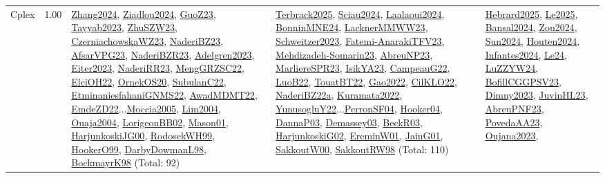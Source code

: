 {\begin{longtable}{p{3cm}r>{\raggedright\arraybackslash}p{6cm}>{\raggedright\arraybackslash}p{6cm}>{\raggedright\arraybackslash}p{8cm}}
\index{Cplex}\index{CPSystems!Cplex}Cplex &  1.00 & \hyperref[detail:Zhang2024]{Zhang2024}, \hyperref[detail:Ziadlou2024]{Ziadlou2024}, \hyperref[detail:GuoZ23]{GuoZ23}, \hyperref[detail:Tayyab2023]{Tayyab2023}, \hyperref[detail:ZhuSZW23]{ZhuSZW23}, \hyperref[detail:CzerniachowskaWZ23]{CzerniachowskaWZ23}, \hyperref[detail:NaderiBZ23]{NaderiBZ23}, \hyperref[detail:AfsarVPG23]{AfsarVPG23}, \hyperref[detail:NaderiBZR23]{NaderiBZR23}, \hyperref[detail:Adelgren2023]{Adelgren2023}, \hyperref[detail:Eiter2023]{Eiter2023}, \hyperref[detail:NaderiRR23]{NaderiRR23}, \hyperref[detail:MengGRZSC22]{MengGRZSC22}, \hyperref[detail:ElciOH22]{ElciOH22}, \hyperref[detail:OrnekOS20]{OrnekOS20}, \hyperref[detail:SubulanC22]{SubulanC22}, \hyperref[detail:EtminaniesfahaniGNMS22]{EtminaniesfahaniGNMS22}, \hyperref[detail:AwadMDMT22]{AwadMDMT22}, \hyperref[detail:EmdeZD22]{EmdeZD22}...\hyperref[detail:Moccia2005]{Moccia2005}, \hyperref[detail:Lim2004]{Lim2004}, \hyperref[detail:Ouaja2004]{Ouaja2004}, \hyperref[detail:LorigeonBB02]{LorigeonBB02}, \hyperref[detail:Mason01]{Mason01}, \hyperref[detail:HarjunkoskiJG00]{HarjunkoskiJG00}, \hyperref[detail:RodosekWH99]{RodosekWH99}, \hyperref[detail:HookerO99]{HookerO99}, \hyperref[detail:DarbyDowmanL98]{DarbyDowmanL98}, \hyperref[detail:BockmayrK98]{BockmayrK98} (Total: 92) & \hyperref[detail:Terbrack2025]{Terbrack2025}, \hyperref[detail:Sciau2024]{Sciau2024}, \hyperref[detail:Laalaoui2024]{Laalaoui2024}, \hyperref[detail:BonninMNE24]{BonninMNE24}, \hyperref[detail:LacknerMMWW23]{LacknerMMWW23}, \hyperref[detail:Schweitzer2023]{Schweitzer2023}, \hyperref[detail:Fatemi-AnarakiTFV23]{Fatemi-AnarakiTFV23}, \hyperref[detail:Mehdizadeh-Somarin23]{Mehdizadeh-Somarin23}, \hyperref[detail:AbreuNP23]{AbreuNP23}, \hyperref[detail:MarliereSPR23]{MarliereSPR23}, \hyperref[detail:IsikYA23]{IsikYA23}, \hyperref[detail:CampeauG22]{CampeauG22}, \hyperref[detail:LuoB22]{LuoB22}, \hyperref[detail:TouatBT22]{TouatBT22}, \hyperref[detail:Gao2022]{Gao2022}, \hyperref[detail:CilKLO22]{CilKLO22}, \hyperref[detail:NaderiBZ22a]{NaderiBZ22a}, \hyperref[detail:Kuramata2022]{Kuramata2022}, \hyperref[detail:YunusogluY22]{YunusogluY22}...\hyperref[detail:PerronSF04]{PerronSF04}, \hyperref[detail:Hooker04]{Hooker04}, \hyperref[detail:DannaP03]{DannaP03}, \hyperref[detail:Demassey03]{Demassey03}, \hyperref[detail:BeckR03]{BeckR03}, \hyperref[detail:HarjunkoskiG02]{HarjunkoskiG02}, \hyperref[detail:EreminW01]{EreminW01}, \hyperref[detail:JainG01]{JainG01}, \hyperref[detail:SakkoutW00]{SakkoutW00}, \hyperref[detail:SakkoutRW98]{SakkoutRW98} (Total: 110) & \hyperref[detail:Hebrard2025]{Hebrard2025}, \hyperref[detail:Le2025]{Le2025}, \hyperref[detail:Bansal2024]{Bansal2024}, \hyperref[detail:Zou2024]{Zou2024}, \hyperref[detail:Sun2024]{Sun2024}, \hyperref[detail:Houten2024]{Houten2024}, \hyperref[detail:Infantes2024]{Infantes2024}, \hyperref[detail:Le24]{Le24}, \hyperref[detail:LuZZYW24]{LuZZYW24}, \hyperref[detail:BofillCGGPSV23]{BofillCGGPSV23}, \hyperref[detail:Dimny2023]{Dimny2023}, \hyperref[detail:JuvinHL23]{JuvinHL23}, \hyperref[detail:AbreuPNF23]{AbreuPNF23}, \hyperref[detail:PovedaAA23]{PovedaAA23}, \hyperref[detail:Oujana2023]{Oujana2023}, 
\end{longtable}}
